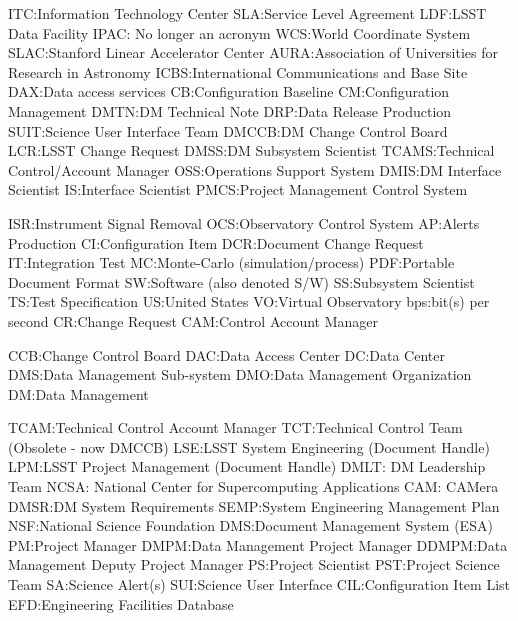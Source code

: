ITC:Information Technology Center
SLA:Service Level Agreement
LDF:LSST Data Facility
IPAC: No longer an acronym
WCS:World Coordinate System
SLAC:Stanford Linear Accelerator Center
AURA:Association of Universities for Research in Astronomy
ICBS:International Communications and Base Site
DAX:Data access services
CB:Configuration Baseline
CM:Configuration Management
DMTN:DM Technical Note
DRP:Data Release Production
SUIT:Science User Interface Team
DMCCB:DM Change Control Board
LCR:LSST Change Request
DMSS:DM Subsystem Scientist
TCAMS:Technical Control/Account Manager
OSS:Operations Support System
DMIS:DM Interface Scientist
IS:Interface Scientist
PMCS:Project Management Control System

ISR:Instrument Signal Removal
OCS:Observatory Control System
AP:Alerts Production
CI:Configuration Item
DCR:Document Change Request
IT:Integration Test
MC:Monte-Carlo (simulation/process)
PDF:Portable Document Format
SW:Software (also denoted S/W)
SS:Subsystem Scientist
TS:Test Specification
US:United States
VO:Virtual Observatory
bps:bit(s) per second
CR:Change Request
CAM:Control Account Manager

CCB:Change Control Board
DAC:Data Access Center
DC:Data Center
DMS:Data Management Sub-system
DMO:Data Management Organization
DM:Data Management

TCAM:Technical Control Account Manager
TCT:Technical Control Team (Obsolete - now DMCCB)
LSE:LSST System Engineering (Document Handle)
LPM:LSST Project Management (Document Handle)
DMLT: DM Leadership Team
NCSA: National Center for Supercomputing Applications
CAM: CAMera
DMSR:DM System Requirements
SEMP:System Engineering Management Plan
NSF:National Science Foundation
DMS:Document Management System (ESA)
PM:Project Manager
DMPM:Data Management Project Manager
DDMPM:Data Management Deputy Project Manager
PS:Project Scientist
PST:Project Science Team
SA:Science Alert(s)
SUI:Science User Interface
CIL:Configuration Item List
EFD:Engineering Facilities Database  
